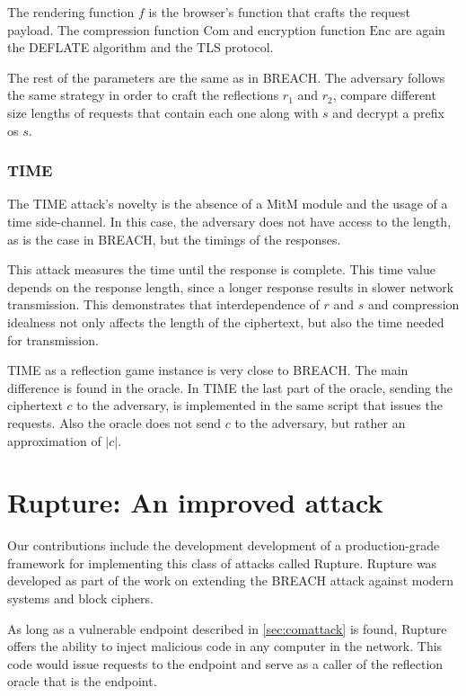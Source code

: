 \documentclass[conference, letterpaper, 10pt]{IEEEtran}
\begin{document}
The rendering function $f$ is the browser's function that crafts the request
payload. The compression function $\textrm{Com}$ and encryption function
$\textrm{Enc}$ are again
the DEFLATE algorithm and the TLS protocol.

The rest of the parameters are the same as in BREACH. The adversary follows the
same strategy in order to craft the reflections $r_1$ and $r_2$, compare
different size lengths of requests that contain each one along with $s$ and
decrypt a prefix os $s$.

\subsubsection{TIME}
The TIME attack's novelty is the absence of a MitM module and the usage of a
time side-channel. In this case, the adversary does not have access to the
length, as is the case in BREACH, but the timings of the responses.

This attack measures the time until the response is complete. This time value
depends on the response length, since a longer response results in slower
network transmission. This demonstrates that interdependence of $r$ and $s$ and
compression idealness not only affects the length of the ciphertext, but also
the time needed for transmission.

TIME as a reflection game instance is very close to BREACH. The main difference
is found in the oracle. In TIME the last part of the oracle, sending the
ciphertext $c$ to the adversary, is implemented in the same script that issues the
requests. Also the oracle does not send $c$ to the adversary, but
rather an approximation of $\rvert c \rvert$.

\section{Rupture: An improved attack}\label{subsec:rupture}
Our contributions include the development development of a production-grade
framework for implementing this class of attacks called Rupture.
Rupture was developed as part of the work on extending the BREACH attack against
modern systems and block ciphers.

As long as a vulnerable endpoint described in \ref{sec:comattack} is found,
Rupture offers the ability to inject malicious code in any computer in the
network. This code would issue requests to the endpoint and serve as a caller of
the reflection oracle that is the endpoint.
\end{document}
